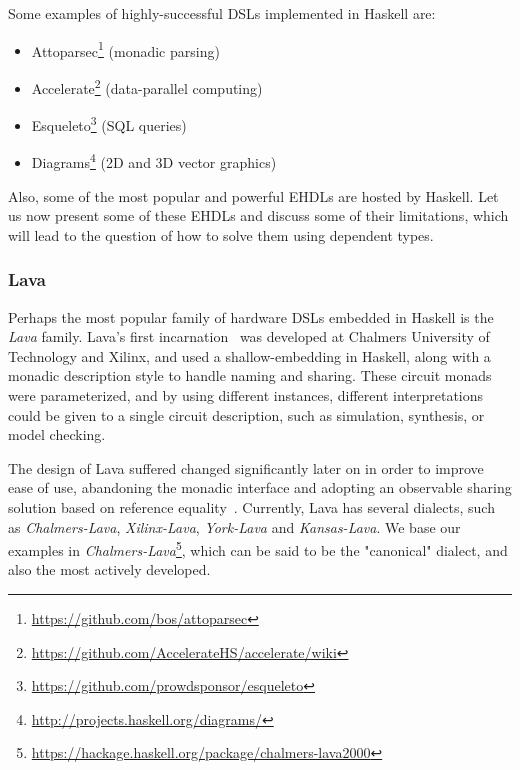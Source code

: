             Some examples of highly-successful \acp{DSL} implemented in Haskell are:

            \begin{itemize}
                \item Attoparsec\footnote{\url{https://github.com/bos/attoparsec}} (monadic parsing)
                \item Accelerate\footnote{\url{https://github.com/AccelerateHS/accelerate/wiki}} (data-parallel computing)
                \item Esqueleto\footnote{\url{https://github.com/prowdsponsor/esqueleto}} (SQL queries)
                \item Diagrams\footnote{\url{http://projects.haskell.org/diagrams/}} (2D and 3D vector graphics)
            \end{itemize}

            Also, some of the most popular and powerful \acp{EHDL} are hosted by Haskell.
            Let us now present some of these \acp{EHDL} and discuss some of their limitations,
            which will lead to the question of how to solve them using dependent types.

            \subsubsection{Lava}
            \label{subsubsec:lava}
            Perhaps the most popular family of hardware \acp{DSL} embedded in Haskell is the \emph{Lava} family.
            Lava's first incarnation~\cite{lava-1999} was developed at Chalmers University of Technology
            and Xilinx, and used a shallow-embedding in Haskell, along with a monadic description style
            to handle naming and sharing.
            These circuit monads were parameterized, and by using different instances,
            different interpretations could be given to a single circuit description, such as
            simulation, synthesis, or model checking.

            The design of Lava suffered changed significantly later on in order to improve ease of use,
            abandoning the monadic interface and adopting
            an observable sharing solution based on reference equality~\cite{observable-sharing-circuits}.
            Currently, Lava has several dialects, such as \emph{Chalmers-Lava}, \emph{Xilinx-Lava}, \emph{York-Lava} and \emph{Kansas-Lava}.
            We base our examples in \emph{Chalmers-Lava}\footnote{\url{https://hackage.haskell.org/package/chalmers-lava2000}},
            which can be said to be the "canonical" dialect, and also the most actively developed.

